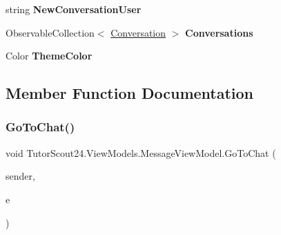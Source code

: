 \begin{DoxyCompactItemize}
\item 
\mbox{\label{class_tutor_scout24_1_1_view_models_1_1_message_view_model_a9780402ef59416476a7fcfdd031461a9}} 
string {\bfseries New\+Conversation\+User}
\item 
\mbox{\label{class_tutor_scout24_1_1_view_models_1_1_message_view_model_aae41dcd09094386df8b712a62f4a18ca}} 
Observable\+Collection$<$ \mbox{\hyperlink{class_tutor_scout24_1_1_models_1_1_chat_1_1_conversation}{Conversation}} $>$ {\bfseries Conversations}
\item 
\mbox{\label{class_tutor_scout24_1_1_view_models_1_1_message_view_model_a0f757e9800a7272add8ee681abb92bb9}} 
Color {\bfseries Theme\+Color}
\end{DoxyCompactItemize}


\subsection{Member Function Documentation}
\mbox{\label{class_tutor_scout24_1_1_view_models_1_1_message_view_model_ad4ca19244326d28fed25ee600004c936}} 
\subsubsection{\texorpdfstring{Go\+To\+Chat()}{GoToChat()}}
{\footnotesize\ttfamily void Tutor\+Scout24.\+View\+Models.\+Message\+View\+Model.\+Go\+To\+Chat (\begin{DoxyParamCaption}\item[{object}]{sender,  }\item[{Event\+Args}]{e }\end{DoxyParamCaption})\hspace{0.3cm}{\ttfamily [inline]}}



